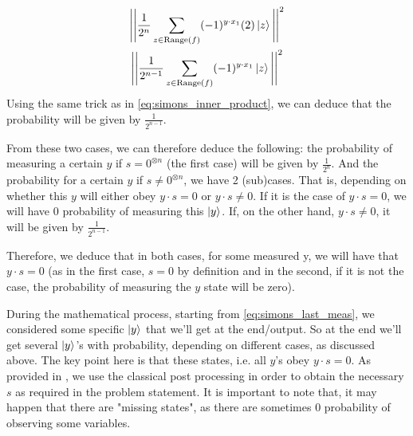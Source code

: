 \begin{gather}
  \Bigg| \Bigg| \frac{1}{2^n} \sum_{z\in \text{Range}(f)} (-1)^{y\cdot x_1}(2)\ket{z} \Bigg| \Bigg|^2 \\
  \Bigg| \Bigg| \frac{1}{2^{n-1}} \sum_{z\in \text{Range}(f)} (-1)^{y\cdot x_1}\ket{z} \Bigg| \Bigg|^2 
\end{gather}
Using the same trick as in \autoref{eq:simons_inner_product}, we can deduce that the probability will be given by $\frac{1}{2^{n-1}}$.

From these two cases, we can therefore deduce the following: the probability of measuring a certain $y$ if $s=0^{\otimes n}$ (the first case) will be given 
by $\frac{1}{2^n}$.
And the probability for a certain $y$ if $s\neq 0^{\otimes n}$, we have 2 (sub)cases. That is, depending on whether this $y$ will either obey
$y\cdot s=0$ or $y\cdot s\neq 0$. If it is the case of $y\cdot s=0$, we will have 0 probability of measuring this $\ket{y}$. If, on the other hand,
$y\cdot s\neq 0$, it will be given by $\frac{1}{2^{n-1}}$. 


Therefore, we deduce that in both cases, for some measured y, we will have that \underline{$y\cdot s =0$} (as in the first case, $s=0$ by definition and in the second, 
if it is not the case, the probability of measuring the $y$ state will be zero).

During the mathematical process, starting from \autoref{eq:simons_last_meas}, we considered some specific $\ket{y}$ that we'll get at the end/output.
So at the end we'll get several $\ket{y}$'s with probability, depending on different cases, as discussed above. The key point here is that 
these states, i.e. all $y$'s obey $y\cdot s = 0$.
As provided in \cite{noauthor_simons_2023}, we use the classical post processing in order to obtain the necessary $s$ as required in the problem statement.
It is important to note that, it may happen that there are "missing states", as there are sometimes 0 probability of observing some variables. 











